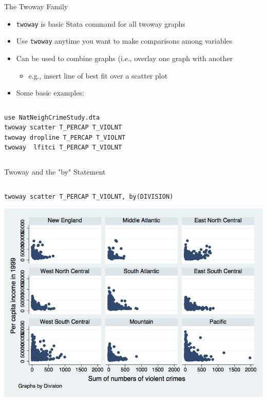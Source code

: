 \documentclass[table,smaller]{beamer}
\begin{document}
\begin{frame}[fragile,label=sec-3-1]{The Twoway Family}
 \begin{itemize}
\item \texttt{twoway} is basic Stata command for all twoway graphs
\item Use \texttt{twoway} anytime you want to make comparisons among variables
\item Can be used to combine graphs (i.e., overlay one graph with another
\begin{itemize}
\item e.g., insert line of best fit over a scatter plot
\end{itemize}

\item Some basic examples:
\end{itemize}
\vspace{-.5em} \begin{columns}  \begin{block}{}
\begin{verbatim}
use NatNeighCrimeStudy.dta
twoway scatter T_PERCAP T_VIOLNT
twoway dropline T_PERCAP T_VIOLNT
twoway  lfitci T_PERCAP T_VIOLNT
\end{verbatim}
\end{block} \end{columns}
\end{frame}
\begin{frame}[fragile,label=sec-3-2]{Twoway and the "by" Statement}
 \vspace{-.5em} \begin{columns}  \begin{block}{}
\begin{verbatim}
twoway scatter T_PERCAP T_VIOLNT, by(DIVISION)
\end{verbatim}



\includegraphics[width=.9\linewidth]{./images/twowayby.png}

\end{block} \end{columns}
\end{frame}
\end{document}
